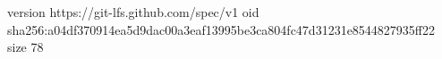 version https://git-lfs.github.com/spec/v1
oid sha256:a04df370914ea5d9dac00a3eaf13995be3ca804fc47d31231e8544827935ff22
size 78
